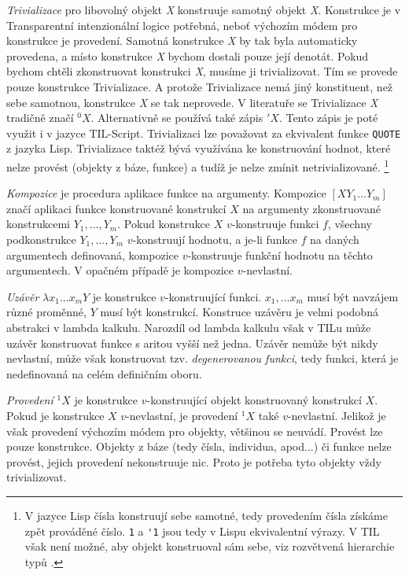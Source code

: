 \lstset{language=Lisp}
\textit{Trivializace} pro libovolný objekt \textit{X} konstruuje samotný objekt \textit{X}.
Konstrukce je v Transparentní intenzionální logice potřebná, neboť výchozím módem pro konstrukce
je provedení. Samotná konstrukce \textit{X} by tak byla automaticky provedena, a místo konstrukce
\textit{X} bychom dostali pouze její denotát. Pokud bychom chtěli zkonstruovat konstrukci
\textit{X}, musíme ji trivializovat. Tím se provede pouze konstrukce Trivializace. A protože
Trivializace nemá jiný konstituent, než sebe samotnou, konstrukce \textit{X} se tak neprovede.
V literatuře se Trivializace \textit{X} tradičně značí ${}^0X$. Alternativně se používá také zápis
$'X$. Tento zápis je poté využit i v jazyce TIL-Script. Trivializaci lze považovat za ekvivalent
funkce \lstinline{QUOTE} z jazyka Lisp. Trivializace taktéž bývá využívána ke konstruování hodnot,
které nelze provést (objekty z báze, funkce) a tudíž je nelze zmínit netrivializované.
\footnote{
    V jazyce Lisp čísla konstruují sebe samotné, tedy provedením čísla získáme zpět prováděné
    číslo. \lstinline{1} a \lstinline{'1} jsou tedy v Lispu ekvivalentní výrazy. V TIL však není
    možné, aby objekt konstruoval sám sebe, viz rozvětvená hierarchie typů .
}
\lstset{language=Tilscript}

\textit{Kompozice} je procedura aplikace funkce na argumenty. Kompozice $[X Y_1...Y_m]$ značí
aplikaci funkce konstruované konstrukcí $X$ na argumenty zkonstruované konstrukcemi $Y_1,...,Y_m$.
Pokud konstrukce $X$ $v$-konstruuje funkci $f$, všechny podkonstrukce $Y_1,...,Y_m$ $v$-konstruují
hodnotu, a je-li funkce $f$ na daných argumentech definovaná, kompozice $v$-konstruuje funkční
hodnotu na těchto argumentech. V opačném případě je kompozice $v$-nevlastní.

\textit{Uzávěr} $\lambda x_1...x_m Y$ je konstrukce $v$-konstruující funkci. $x_1,...x_m$ musí
být navzájem různé proměnné, $Y$ musí být konstrukcí. Konstruce uzávěru je velmi podobná abstrakci
v lambda kalkulu. Narozdíl od lambda kalkulu však v TILu může uzávěr konstruovat funkce s aritou
vyšší než jedna. Uzávěr nemůže být nikdy nevlastní, může však konstruovat tzv.
\textit{degenerovanou funkci}, tedy funkci, která je nedefinovaná na celém definičním oboru.

\textit{Provedení} ${}^1X$ je konstrukce $v$-konstruující objekt konstruovaný konstrukcí $X$.
Pokud je konstrukce $X$ $v$-nevlastní, je provedení ${}^1X$ také $v$-nevlastní. Jelikož je však
provedení výchozím módem pro objekty, většinou se neuvádí. Provést lze pouze konstrukce. Objekty
z báze (tedy čísla, individua, apod...) či funkce nelze provést, jejich provedení nekonstruuje nic.
Proto je potřeba tyto objekty vždy trivializovat.

